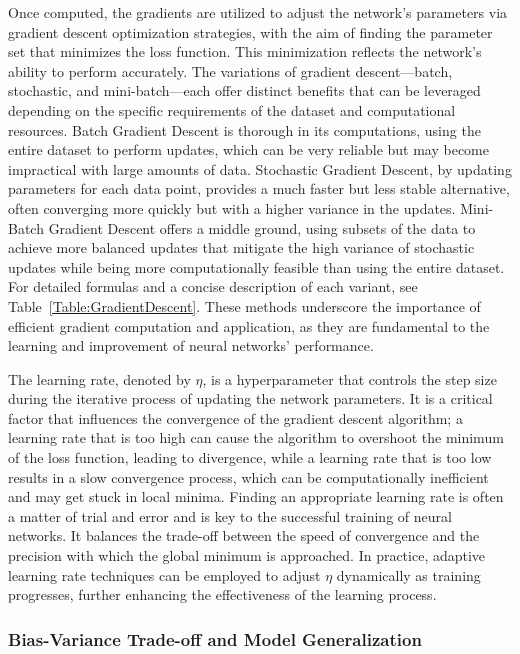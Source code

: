 Once computed, the gradients are utilized to adjust the network's parameters via gradient descent optimization strategies, with the aim of finding the parameter set that minimizes the loss function. This minimization reflects the network's ability to perform accurately. The variations of gradient descent—batch, stochastic, and mini-batch—each offer distinct benefits that can be leveraged depending on the specific requirements of the dataset and computational resources. Batch Gradient Descent is thorough in its computations, using the entire dataset to perform updates, which can be very reliable but may become impractical with large amounts of data. Stochastic Gradient Descent, by updating parameters for each data point, provides a much faster but less stable alternative, often converging more quickly but with a higher variance in the updates. Mini-Batch Gradient Descent offers a middle ground, using subsets of the data to achieve more balanced updates that mitigate the high variance of stochastic updates while being more computationally feasible than using the entire dataset. For detailed formulas and a concise description of each variant, see Table~\ref{Table:GradientDescent}. These methods underscore the importance of efficient gradient computation and application, as they are fundamental to the learning and improvement of neural networks' performance.



The learning rate, denoted by \( \eta \), is a hyperparameter that controls the step size during the iterative process of updating the network parameters. It is a critical factor that influences the convergence of the gradient descent algorithm; a learning rate that is too high can cause the algorithm to overshoot the minimum of the loss function, leading to divergence, while a learning rate that is too low results in a slow convergence process, which can be computationally inefficient and may get stuck in local minima. Finding an appropriate learning rate is often a matter of trial and error and is key to the successful training of neural networks. It balances the trade-off between the speed of convergence and the precision with which the global minimum is approached. In practice, adaptive learning rate techniques can be employed to adjust \( \eta \) dynamically as training progresses, further enhancing the effectiveness of the learning process.

\subsubsection{Bias-Variance Trade-off and Model Generalization}

